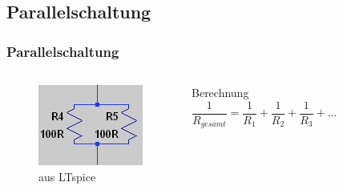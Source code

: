 \subsection{Parallelschaltung}
\begin{frame}
  \frametitle{Parallelschaltung}
  \begin{columns}
    \begin{center}
      \begin{figure}
        \includegraphics[width=.8\textwidth,height=.5\textheight,keepaspectratio]{e04/Parallel.png}
        \caption{aus LTspice}
      \end{figure}
    \end{center}
    \pause
    \begin{block}{Berechnung}
      $$\frac{1}{R_{gesamt}} = \frac{1}{R_1} + \frac{1}{R_2} + \frac{1}{R_3} + ...$$
    \end{block}
  \end{columns}
\end{frame}

